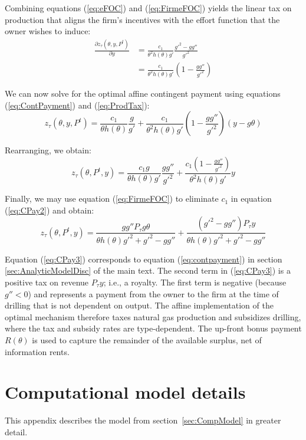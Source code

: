 \documentclass[12pt]{article}
\begin{document}
Combining equations (\ref{eq:eFOC}) and (\ref{eq:FirmeFOC}) yields the linear tax on production that aligns the firm's incentives with the effort function that the owner wishes to induce:
\begin{align}
\frac{\partial z_\tau(\theta,y,P^t)}{\partial y} &= \frac{c_1}{\theta^2 h(\theta)g'}\frac{g'^2-gg''}{g'^2} \nonumber \\
&= \frac{c_1}{\theta^2 h(\theta)g'}\left(1-\frac{gg''}{g'^2}\right) \label{eq:ProdTax}
\end{align}

We can now solve for the optimal affine contingent payment using equations (\ref{eq:ContPayment}) and (\ref{eq:ProdTax}):
\begin{equation}
z_\tau(\theta,y,P^t) = \frac{c_1}{\theta h(\theta)}\frac{g}{g'} + \frac{c_1}{\theta^2 h(\theta)g'}\left(1-\frac{gg''}{g'^2}\right) \left( y-g\theta\right) \label{eq:CPay}
\end{equation}

Rearranging, we obtain:
\begin{equation}
z_\tau(\theta,P^t,y) = \frac{c_1g}{\theta h(\theta)g'}\frac{gg''}{g'^2} + \frac{c_1(1-\frac{gg''}{g'^2})}{\theta^2 h(\theta)g'}y \label{eq:CPay2}
\end{equation}

Finally, we may use equation (\ref{eq:FirmeFOC}) to eliminate $c_1$ in equation (\ref{eq:CPay2}) and obtain:
\begin{equation}
z_\tau(\theta,P^t,y) = \frac{gg''P_\tau g\theta}{\theta h(\theta)g'^2+g'^2-gg''} + \frac{(g'^2-gg'')P_\tau y}{\theta h(\theta)g'^2+g'^2-gg''} \label{eq:CPay3}
\end{equation}

Equation (\ref{eq:CPay3}) corresponds to equation (\ref{eq:contpayment}) in section \ref{sec:AnalyticModelDisc} of the main text. The second term in (\ref{eq:CPay3}) is a positive tax on revenue $P_\tau y$; i.e., a royalty. The first term is negative (because $g''<0$) and represents a payment from the owner to the firm at the time of drilling that is not dependent on output. The affine implementation of the optimal mechanism therefore taxes natural gas production and subsidizes drilling, where the tax and subsidy rates are type-dependent. The up-front bonus payment $R(\theta)$ is used to capture the remainder of the available surplus, net of information rents.


\section{Computational model details \label{appx:comp_model_details}}
This appendix describes the model from section~\ref{sec:CompModel} in greater detail.
\end{document}
